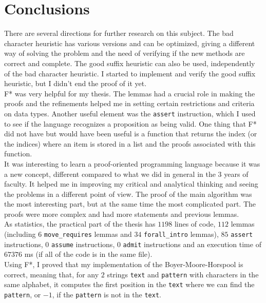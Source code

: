 \chapter*{Conclusions} 

There are several directions for further research on this subject. The bad character heuristic has various versions and can be optimized, giving a different way of solving the problem and the need of verifying if the new methods are correct and complete. The good suffix heuristic can also be used, independently of the bad character heuristic. I started to implement and verify the good suffix heuristic, but I didn't end the proof of it yet.\\
\indent F* was very helpful for my thesis. The lemmas had a crucial role in making the proofs and the refinements helped me in setting certain restrictions and criteria on data types. Another useful element was the \texttt{assert} instruction, which I used to see if the language recognizes a proposition as being valid. One thing that F* did not have but would have been useful is a function that returns the index (or the indices) where an item is stored in a list and the proofs associated with this function. \\
\indent It was interesting to learn a proof-oriented programming language because it was a new concept, different compared to what we did in general in the \(3\) years of faculty. It helped me in improving my critical and analytical thinking and seeing the problems in a different point of view. The proof of the main algorithm was the most interesting part, but at the same time the most complicated part. The proofs were more complex and had more statements and previous lemmas.\\
\indent As statistics, the practical part of the thesis has \(1198\) lines of code, \(112\) lemmas (including \(6\) \texttt{move\_requires} lemmas and \(34\) \texttt{forall\_intro} lemmas), \(85\) \texttt{assert} instructions, \(0\) \texttt{assume} instructions, \(0\) \texttt{admit} instructions and
an execution time of \(67376\) ms (if all of the code is in the same file). \\
\indent Using F*, I proved that my implementation of the Boyer-Moore-Horspool is correct, meaning that, for any \(2\) strings \texttt{text} and \texttt{pattern} with characters in the same alphabet, it computes the first position in the \texttt{text} where we can find the \texttt{pattern}, or \(-1\), if the \texttt{pattern} is not in the \texttt{text}.